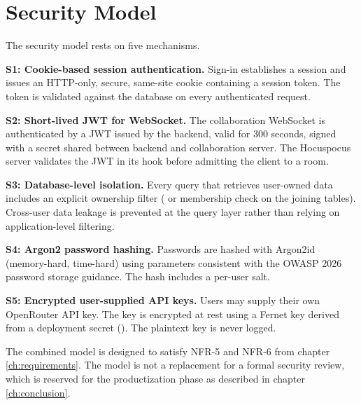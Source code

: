 \section{Security Model}
\label{sec:arch-security}

The security model rests on five mechanisms.

\textbf{S1: Cookie-based session authentication.} Sign-in establishes a session and issues an HTTP-only, secure, same-site cookie containing a session token. The token is validated against the database on every authenticated request.

\textbf{S2: Short-lived JWT for WebSocket.} The collaboration WebSocket is authenticated by a JWT issued by the backend, valid for 300 seconds, signed with a secret shared between backend and collaboration server. The Hocuspocus server validates the JWT in its  hook before admitting the client to a room.

\textbf{S3: Database-level isolation.} Every query that retrieves user-owned data includes an explicit ownership filter ( or membership check on the joining tables). Cross-user data leakage is prevented at the query layer rather than relying on application-level filtering.

\textbf{S4: Argon2 password hashing.} Passwords are hashed with Argon2id (memory-hard, time-hard) using parameters consistent with the OWASP 2026 password storage guidance. The hash includes a per-user salt.

\textbf{S5: Encrypted user-supplied API keys.} Users may supply their own OpenRouter API key. The key is encrypted at rest using a Fernet key derived from a deployment secret (). The plaintext key is never logged.

The combined model is designed to satisfy NFR-5 and NFR-6 from chapter \ref{ch:requirements}. The model is not a replacement for a formal security review, which is reserved for the productization phase as described in chapter \ref{ch:conclusion}.
